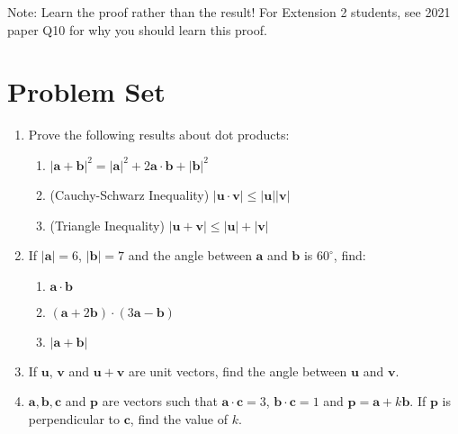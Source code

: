 \documentclass[11pt, a4paper, oneside]{exam}
\theoremstyle{definition}\newtheorem{define}{Definition}[section]
\theoremstyle{remark}\newtheorem{remark}{Remark}
\theoremstyle{definition}\newtheorem{example}{Example}[subsection]
\theoremstyle{definition}\newtheorem{notation}{Notation}[section]
\theoremstyle{definition}\newtheorem{theorem}{Theorem}[section]
\theoremstyle{definition}\newtheorem{corollary}{Corollary}[section]
\begin{document}
\noindent Note: Learn the proof rather than the result! For Extension 2 students, see 2021 paper Q10 for why you should learn this proof.

\newpage
\section{Problem Set}

\begin{enumerate}
  \item Prove the following results about dot products:
  \begin{enumerate}
    \item $|\mathbf{a} + \mathbf{b}|^2 = |\mathbf{a}|^2 + 2 \mathbf{a}\cdot \mathbf{b} + |\mathbf{b}|^2$\\

    \item (Cauchy-Schwarz Inequality) $|\mathbf{u}\cdot \mathbf{v}| \leq |\mathbf{u}||\mathbf{v}|$\\

    \item (Triangle Inequality) $|\mathbf{u} + \mathbf{v}| \leq |\mathbf{u}| + |\mathbf{v}|$\\
  \end{enumerate}

  \item If $|\mathbf{a}| = 6$, $|\mathbf{b}| = 7$ and the angle between $\mathbf{a}$ and $\mathbf{b}$ is $60^\circ$, find:
  \begin{enumerate}
    \item $\mathbf{a} \cdot \mathbf{b}$\\
    \item $(\mathbf{a} + 2\mathbf{b})\cdot (3\mathbf{a} - \mathbf{b})$\\
    \item $|\mathbf{a} + \mathbf{b}|$\\
  \end{enumerate}

\item If $\mathbf{u}$, $\mathbf{v}$ and $\mathbf{u} + \mathbf{v}$ are unit vectors, find the angle between $\mathbf{u}$ and $\mathbf{v}$.\\

\item $\mathbf{a}, \mathbf{b},\mathbf{c}$ and $\mathbf{p}$ are vectors such that $\mathbf{a}\cdot \mathbf{c} =3$, $\mathbf{b}\cdot \mathbf{c} = 1$ and $\mathbf{p} = \mathbf{a} + k \mathbf{b}$. If $\mathbf{p}$ is perpendicular to $\mathbf{c}$, find the value of $k$.\\



\end{enumerate}
\end{document}
